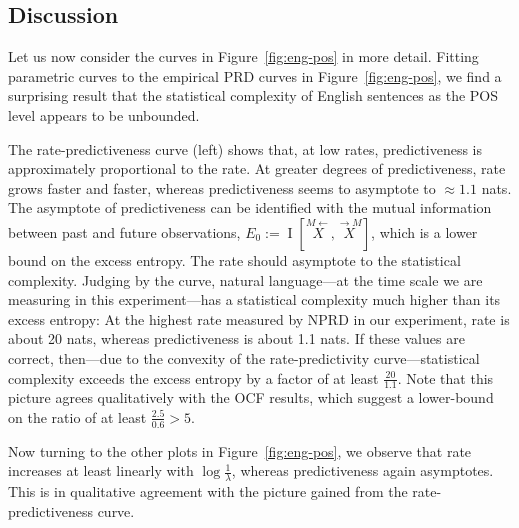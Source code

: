 \documentclass[entropy,article,submit,moreauthors,pdftex,10pt,a4paper]{Definitions/mdpi}
\newif \ifcomment
\newcommand\rljf[1]{\ifcomment{{\color{blue}(#1)}}\else{}\fi}
\newcommand{\finitefuture}{\stackrel{\rightarrow \scriptscriptstyle{M}}{X}}
\newcommand{\finitepast}{\stackrel{\scriptscriptstyle{M}\leftarrow}{X}}%
\begin{document}
\subsection{Discussion}
Let us now consider the curves in Figure~\ref{fig:eng-pos} in more detail.
Fitting parametric curves to the empirical PRD curves in Figure~\ref{fig:eng-pos}, we find a surprising result that the statistical complexity of English sentences as the POS level appears to be unbounded.

The rate-predictiveness curve (left) shows that, at low rates, predictiveness is approximately proportional to the rate.
At greater degrees of predictiveness, rate grows faster and faster, whereas predictiveness seems to asymptote to $\approx 1.1$ nats.
The asymptote of predictiveness can be identified with the mutual information between past and future observations, $E_0 := \operatorname{I}[\finitepast, \finitefuture]$, which is a lower bound on the excess entropy. The rate should asymptote to the statistical complexity.
Judging by the curve, natural language---at the time scale we are measuring in this experiment---has a statistical complexity much higher than its excess entropy:
At the highest rate measured by NPRD in our experiment, rate is about 20 nats, whereas predictiveness is about 1.1 nats.
If these values are correct, then---due to the convexity of the rate-predictivity curve---statistical complexity exceeds the excess entropy by a factor of at least $\frac{20}{1.1}$. %
Note that this picture agrees qualitatively with the OCF results, which suggest a lower-bound on the ratio of at least $\frac{2.5}{0.6} > 5$.

Now turning to the other plots in Figure~\ref{fig:eng-pos}, we observe that rate increases at least linearly with $\log\frac{1}{\lambda}$, whereas predictiveness again asymptotes.
This is in qualitative agreement with the picture gained from the rate-predictiveness curve.
\end{document}
